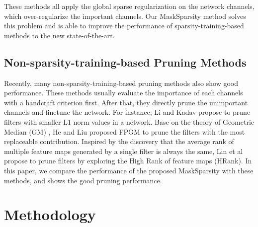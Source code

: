 \documentclass[review]{cvpr}
\begin{document}
These methods all apply the global sparse regularization on the network channels, which over-regularize the important channels. Our MaskSparsity method solves this problem and is able to improve the performance of sparsity-training-based methods to the new state-of-the-art.

\subsection{Non-sparsity-training-based Pruning Methods}
Recently, many non-sparsity-training-based pruning methods also show good  performance. These methods usually evaluate the importance of each channels with a handcraft criterion first. After that, they directly prune the unimportant channels and finetune the network.
For instance, Li and Kadav \cite{L1} propose to prune filters with smaller L1 norm values in a network. Base on the theory of Geometric Median (GM) \cite{GM}, He and Liu proposed FPGM\cite{FPGM} to prune the filters with the most replaceable contribution. Inspired by the discovery that the average rank of multiple feature maps generated by a single filter is always the same, Lin et al \cite{lin2020hrank} propose to prune filters by exploring the High Rank of feature maps (HRank).  
In this paper, we compare the performance of the proposed MaskSparsity with these methods, and shows the good pruning performance.

 


\section{Methodology}
\end{document}
